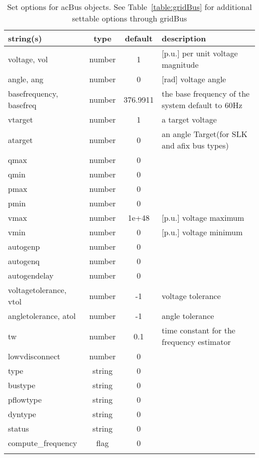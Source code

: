 \begin{longtable}{p{5cm} c c p{7cm}}
string(s) & type & default & description \\
\hline
voltage, vol & number & 1 & [p.u.]    per unit voltage magnitude\\
angle, ang & number & 0 & [rad]     voltage angle\\
basefrequency, basefreq & number & 376.9911 & the base frequency of the system default to 60Hz\\
vtarget & number & 1 & a target voltage\\
atarget & number & 0 & an angle Target(for SLK and afix bus types)\\
qmax & number & 0 & \\
qmin & number & 0 & \\
pmax & number & 0 & \\
pmin & number & 0 & \\
vmax & number & 1e+48 & [p.u.]    voltage maximum\\
vmin & number & 0 & [p.u.]    voltage minimum\\
autogenp & number & 0 & \\
autogenq & number & 0 & \\
autogendelay & number & 0 & \\
voltagetolerance, vtol & number & -1 & voltage tolerance\\
angletolerance, atol & number & -1 & angle tolerance\\
tw & number & 0.1 & time constant for the frequency estimator\\
lowvdisconnect & number & 0 & \\
type & string & 0 & \\
bustype & string & 0 & \\
pflowtype & string & 0 & \\
dyntype & string & 0 & \\
status & string & 0 & \\
compute\_frequency & flag & 0 & \\
\hline
\caption{Set options for acBus objects. See Table~\ref{table:gridBus} for additional settable options through gridBus}
\label{table:acBus}
\end{longtable}

